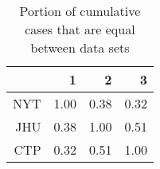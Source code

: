 \begin{table}[ht]
\centering
\begin{tabular}{rrrr}
  \hline
 & 1 & 2 & 3 \\ 
  \hline
NYT & 1.00 & 0.38 & 0.32 \\ 
  JHU & 0.38 & 1.00 & 0.51 \\ 
  CTP & 0.32 & 0.51 & 1.00 \\ 
   \hline
\end{tabular}
\caption{Portion of cumulative cases that are equal between data sets\label{tab:casediff}} 
\end{table}
